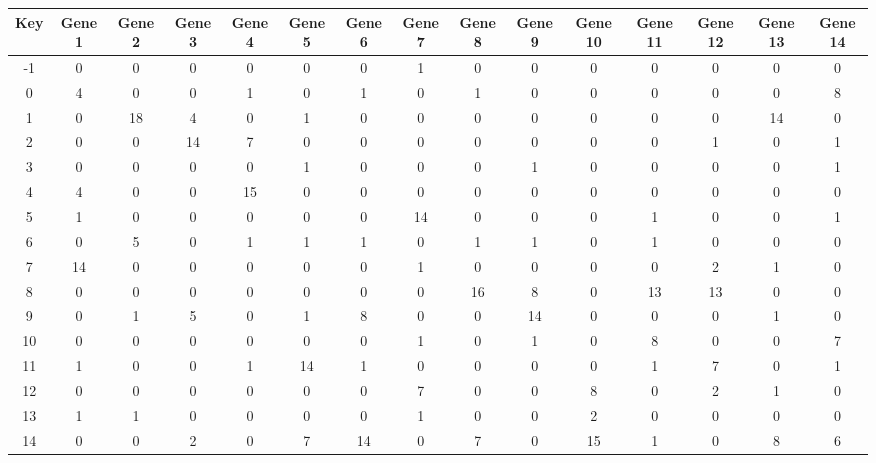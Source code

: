 \begin{tabular}{|c|c|c|c|c|c|c|c|c|c|c|c|c|c|c|}
\hline
Key & Gene 1 & Gene 2 & Gene 3 & Gene 4 & Gene 5 & Gene 6 & Gene 7 & Gene 8 & Gene 9 & Gene 10 & Gene 11 & Gene 12 & Gene 13 & Gene 14 \\
\hline
-1 & 0 & 0 & 0 & 0 & 0 & 0 & 1 & 0 & 0 & 0 & 0 & 0 & 0 & 0 \\
0 & 4 & 0 & 0 & 1 & 0 & 1 & 0 & 1 & 0 & 0 & 0 & 0 & 0 & 8 \\
1 & 0 & 18 & 4 & 0 & 1 & 0 & 0 & 0 & 0 & 0 & 0 & 0 & 14 & 0 \\
2 & 0 & 0 & 14 & 7 & 0 & 0 & 0 & 0 & 0 & 0 & 0 & 1 & 0 & 1 \\
3 & 0 & 0 & 0 & 0 & 1 & 0 & 0 & 0 & 1 & 0 & 0 & 0 & 0 & 1 \\
4 & 4 & 0 & 0 & 15 & 0 & 0 & 0 & 0 & 0 & 0 & 0 & 0 & 0 & 0 \\
5 & 1 & 0 & 0 & 0 & 0 & 0 & 14 & 0 & 0 & 0 & 1 & 0 & 0 & 1 \\
6 & 0 & 5 & 0 & 1 & 1 & 1 & 0 & 1 & 1 & 0 & 1 & 0 & 0 & 0 \\
7 & 14 & 0 & 0 & 0 & 0 & 0 & 1 & 0 & 0 & 0 & 0 & 2 & 1 & 0 \\
8 & 0 & 0 & 0 & 0 & 0 & 0 & 0 & 16 & 8 & 0 & 13 & 13 & 0 & 0 \\
9 & 0 & 1 & 5 & 0 & 1 & 8 & 0 & 0 & 14 & 0 & 0 & 0 & 1 & 0 \\
10 & 0 & 0 & 0 & 0 & 0 & 0 & 1 & 0 & 1 & 0 & 8 & 0 & 0 & 7 \\
11 & 1 & 0 & 0 & 1 & 14 & 1 & 0 & 0 & 0 & 0 & 1 & 7 & 0 & 1 \\
12 & 0 & 0 & 0 & 0 & 0 & 0 & 7 & 0 & 0 & 8 & 0 & 2 & 1 & 0 \\
13 & 1 & 1 & 0 & 0 & 0 & 0 & 1 & 0 & 0 & 2 & 0 & 0 & 0 & 0 \\
14 & 0 & 0 & 2 & 0 & 7 & 14 & 0 & 7 & 0 & 15 & 1 & 0 & 8 & 6 \\
\hline
\end{tabular}